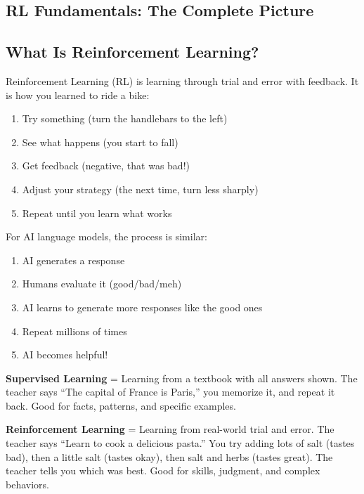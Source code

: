 \begin{chapterenv}

\chapter{RL Fundamentals: The Complete Picture}

\section{What Is Reinforcement Learning?}

Reinforcement Learning (RL) is learning through trial and error with feedback. It is how you learned to ride a bike:

\begin{enumerate}[nosep]
    \item Try something (turn the handlebars to the left)
    \item See what happens (you start to fall)
    \item Get feedback (negative, that was bad!)
    \item Adjust your strategy (the next time, turn less sharply)
    \item Repeat until you learn what works
\end{enumerate}

For AI language models, the process is similar:

\begin{enumerate}[nosep]
    \item AI generates a response
    \item Humans evaluate it (good/bad/meh)
    \item AI learns to generate more responses like the good ones
    \item Repeat millions of times
    \item AI becomes helpful!
\end{enumerate}

\begin{infobox}
\textbf{Supervised Learning} = Learning from a textbook with all answers shown. The teacher says ``The capital of France is Paris,'' you memorize it, and repeat it back. Good for facts, patterns, and specific examples.

\textbf{Reinforcement Learning} = Learning from real-world trial and error. The teacher says ``Learn to cook a delicious pasta.'' You try adding lots of salt (tastes bad), then a little salt (tastes okay), then salt and herbs (tastes great). The teacher tells you which was best. Good for skills, judgment, and complex behaviors.


\end{infobox}
\end{chapterenv}
